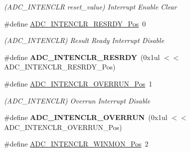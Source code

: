 \begin{DoxyCompactItemize}
\begin{DoxyCompactList}\small\item\em (A\+D\+C\+\_\+\+I\+N\+T\+E\+N\+C\+L\+R reset\+\_\+value) Interrupt Enable Clear \end{DoxyCompactList}\item 
\hypertarget{group___s_a_m_l21___a_d_c_gab124f90030235c342336b98942b4765c}{}\#define \hyperlink{group___s_a_m_l21___a_d_c_gab124f90030235c342336b98942b4765c}{A\+D\+C\+\_\+\+I\+N\+T\+E\+N\+C\+L\+R\+\_\+\+R\+E\+S\+R\+D\+Y\+\_\+\+Pos}~0\label{group___s_a_m_l21___a_d_c_gab124f90030235c342336b98942b4765c}

\begin{DoxyCompactList}\small\item\em (A\+D\+C\+\_\+\+I\+N\+T\+E\+N\+C\+L\+R) Result Ready Interrupt Disable \end{DoxyCompactList}\item 
\hypertarget{group___s_a_m_l21___a_d_c_ga5387dd779ac5635023a51bbc4cb6ca3c}{}\#define {\bfseries A\+D\+C\+\_\+\+I\+N\+T\+E\+N\+C\+L\+R\+\_\+\+R\+E\+S\+R\+D\+Y}~(0x1ul $<$$<$ A\+D\+C\+\_\+\+I\+N\+T\+E\+N\+C\+L\+R\+\_\+\+R\+E\+S\+R\+D\+Y\+\_\+\+Pos)\label{group___s_a_m_l21___a_d_c_ga5387dd779ac5635023a51bbc4cb6ca3c}

\item 
\hypertarget{group___s_a_m_l21___a_d_c_ga6fcd472698b48b4db47c658690780641}{}\#define \hyperlink{group___s_a_m_l21___a_d_c_ga6fcd472698b48b4db47c658690780641}{A\+D\+C\+\_\+\+I\+N\+T\+E\+N\+C\+L\+R\+\_\+\+O\+V\+E\+R\+R\+U\+N\+\_\+\+Pos}~1\label{group___s_a_m_l21___a_d_c_ga6fcd472698b48b4db47c658690780641}

\begin{DoxyCompactList}\small\item\em (A\+D\+C\+\_\+\+I\+N\+T\+E\+N\+C\+L\+R) Overrun Interrupt Disable \end{DoxyCompactList}\item 
\hypertarget{group___s_a_m_l21___a_d_c_gab3033acdbda3633f79d05511f31650e8}{}\#define {\bfseries A\+D\+C\+\_\+\+I\+N\+T\+E\+N\+C\+L\+R\+\_\+\+O\+V\+E\+R\+R\+U\+N}~(0x1ul $<$$<$ A\+D\+C\+\_\+\+I\+N\+T\+E\+N\+C\+L\+R\+\_\+\+O\+V\+E\+R\+R\+U\+N\+\_\+\+Pos)\label{group___s_a_m_l21___a_d_c_gab3033acdbda3633f79d05511f31650e8}

\item 
\hypertarget{group___s_a_m_l21___a_d_c_ga18577e9e20c28d5b25f1674ce80a331f}{}\#define \hyperlink{group___s_a_m_l21___a_d_c_ga18577e9e20c28d5b25f1674ce80a331f}{A\+D\+C\+\_\+\+I\+N\+T\+E\+N\+C\+L\+R\+\_\+\+W\+I\+N\+M\+O\+N\+\_\+\+Pos}~2\label{group___s_a_m_l21___a_d_c_ga18577e9e20c28d5b25f1674ce80a331f}


\end{DoxyCompactItemize}

